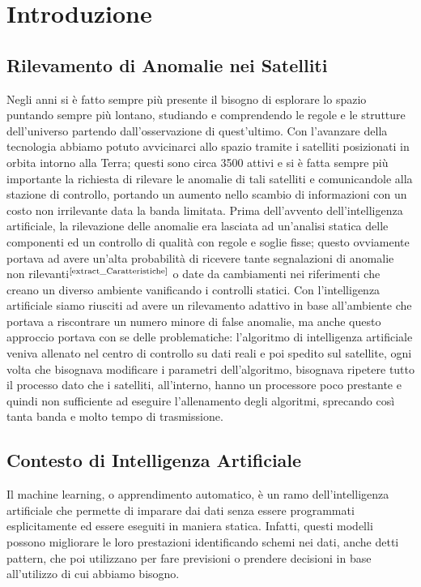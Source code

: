 \chapter{Introduzione}
\section{Rilevamento di Anomalie nei Satelliti}
Negli anni si è fatto sempre più presente il bisogno di esplorare lo spazio puntando sempre più lontano, studiando e comprendendo le regole e le strutture dell'universo partendo dall'osservazione di quest'ultimo. Con l'avanzare della tecnologia abbiamo potuto avvicinarci allo spazio tramite i satelliti posizionati in orbita intorno alla Terra; questi sono circa 3500 attivi e si è fatta sempre più importante la richiesta di rilevare le anomalie di tali satelliti e comunicandole alla stazione di controllo, portando un aumento nello scambio di informazioni con un costo non irrilevante data la banda limitata.
Prima dell'avvento dell'intelligenza artificiale, la rilevazione delle anomalie era lasciata ad un'analisi statica delle componenti ed un controllo di qualità con regole e soglie fisse; questo ovviamente portava ad avere un'alta probabilità di ricevere tante segnalazioni di anomalie non rilevanti$^{\text{\cite{extract_Caratteristiche}}}$ o date da cambiamenti nei riferimenti che creano un diverso ambiente vanificando i controlli statici.
Con l'intelligenza artificiale siamo riusciti ad avere un rilevamento adattivo in base all'ambiente che portava a riscontrare un numero minore di false anomalie, ma anche questo approccio portava con se delle problematiche: l'algoritmo di intelligenza artificiale veniva allenato nel centro di controllo su dati reali e poi spedito sul satellite, ogni volta che bisognava modificare i parametri dell'algoritmo, bisognava ripetere tutto il processo dato che i satelliti, all'interno, hanno un processore poco prestante e quindi non sufficiente ad eseguire l'allenamento degli algoritmi, sprecando così tanta banda e molto tempo di trasmissione.

\section{Contesto di Intelligenza Artificiale}
Il machine learning, o apprendimento automatico, è un ramo dell'intelligenza artificiale che permette di imparare dai dati senza essere programmati esplicitamente ed essere eseguiti in maniera statica.
Infatti, questi modelli possono migliorare le loro prestazioni identificando schemi nei dati, anche detti pattern, che poi utilizzano per fare previsioni o prendere decisioni in base all'utilizzo di cui abbiamo bisogno.


